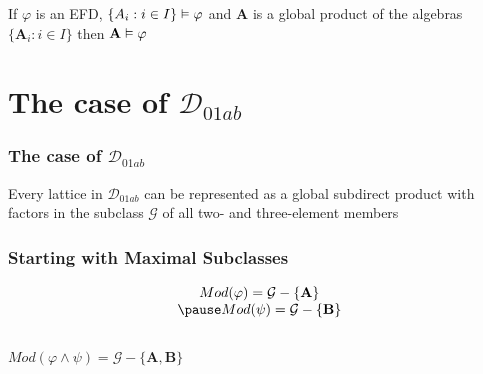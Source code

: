 \documentclass[12pt,handout]{beamer}
\begin{document}
\begin{frame}

\begin{lemma}

\bigskip

 If $\varphi$ is an EFD, $\{A_i : i \in I\} \vDash \varphi$ and $\mathbf{A}$ is a global product of the algebras 
$\{\mathbf{A}_i : i \in I\}$ then $\mathbf{A} \vDash \varphi$

\end{lemma}
 
\end{frame}

\section{The case of $\mathcal{D}_{01ab}$}
\begin{frame}
 \frametitle{The case of $\mathcal{D}_{01ab}$}

\begin{lemma}
 Every lattice in $\mathcal{D}_{01ab}$ can be represented as a global subdirect product with factors in the subclass
$\mathcal{G}$ of all two- and three-element members
\end{lemma}
\end{frame}


\begin{frame}

\frametitle{Starting with Maximal Subclasses}

\[
\begin{array}{c}
Mod(\varphi) = \mathcal{G} - \{\mathbf{A}\} \\ 

\pause
\bigskip

Mod(\psi) = \mathcal{G} - \{\mathbf{B}\}
\end{array}
\]

\pause
\bigskip

\begin{center}
 $Mod(\varphi \wedge \psi) = \mathcal{G} - \{\mathbf{A},\mathbf{B}\}$
\end{center}
 
\end{frame}
\end{document}

